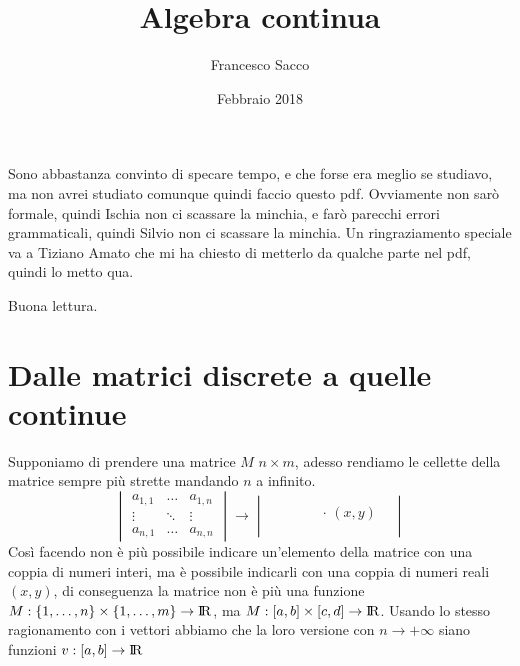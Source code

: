\documentclass[11pt,a4paper]{article}
\date{Febbraio 2018}
\title{Algebra continua}
\author{Francesco Sacco}
\theoremstyle{definition}
\theoremstyle{plain}
\theoremstyle{plain}
\begin{document}
	\maketitle
	Sono abbastanza convinto di specare tempo, e che forse era meglio se studiavo, ma non avrei studiato comunque quindi faccio questo pdf.\newline
	Ovviamente non sarò formale, quindi Ischia non ci scassare la minchia, e farò parecchi errori grammaticali, quindi Silvio non ci scassare la minchia.\newline
	Un ringraziamento speciale va a Tiziano Amato che mi ha chiesto di metterlo da qualche parte nel pdf, quindi lo metto qua.\newline

	Buona lettura.
	

	\section{Dalle matrici discrete a quelle continue}
		Supponiamo di prendere una matrice $M$ $ n \times m$, adesso rendiamo le cellette della matrice sempre più strette mandando $n$ a infinito.
		\begin{equation}
			\begin{vmatrix}
				a_{1,1} & \dots & a_{1,n} \\
				\vdots	&	\ddots&	\vdots	\\
				a_{n,1} & \dots & a_{n,n} 
			\end{vmatrix}
			\longrightarrow
			\begin{vmatrix}
				&\quad & & \\
				&\ &\quad \cdot \, (x,y) & \\
				& & & \\
			\end{vmatrix}
		\end{equation}
		Così facendo non è più possibile indicare un'elemento della matrice con una coppia di numeri interi, ma è possibile indicarli con una coppia di numeri reali $(x,y)$, di  conseguenza la matrice non è più una funzione $M:\{1,\dots,n\}\times\{1,\dots,m\} \rightarrow \rm I\!R$, ma $M:[a,b]\times [c,d]\rightarrow \rm I\!R$.\newline
		Usando lo stesso ragionamento con i vettori abbiamo che la loro versione con $n\rightarrow +\infty$ siano funzioni $v:[a,b]\rightarrow \rm I\!R$ 
	
\end{document}
